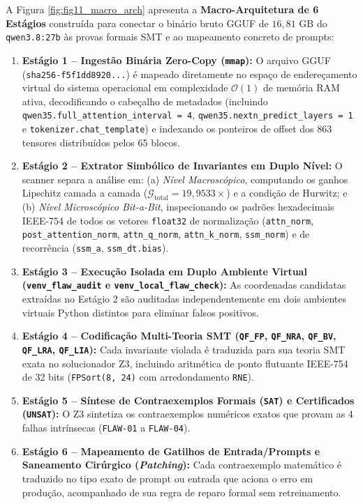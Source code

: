 \documentclass[11pt,a4paper]{article}
\theoremstyle{definition}
\begin{document}
A Figura \ref{fig:fig11_macro_arch} apresenta a \textbf{Macro-Arquitetura de 6 Estágios} construída para conectar o binário bruto GGUF de $16{,}81\text{ GB}$ do \texttt{qwen3.8:27b} às provas formais SMT e ao mapeamento concreto de prompts:
\begin{enumerate}
    \item \textbf{Estágio 1 -- Ingestão Binária Zero-Copy (\texttt{mmap}):} O arquivo GGUF (\texttt{sha256-f5f1dd8920...}) é mapeado diretamente no espaço de endereçamento virtual do sistema operacional em complexidade $\mathcal{O}(1)$ de memória RAM ativa, decodificando o cabeçalho de metadados (incluindo \texttt{qwen35.full\_attention\_interval = 4}, \texttt{qwen35.nextn\_predict\_layers = 1} e \texttt{tokenizer.chat\_template}) e indexando os ponteiros de offset dos 863 tensores distribuídos pelos 65 blocos.
    \item \textbf{Estágio 2 -- Extrator Simbólico de Invariantes em Duplo Nível:} O scanner separa a análise em: (a) \textit{Nível Macroscópico}, computando os ganhos Lipschitz camada a camada ($\mathcal{G}_{\text{total}} = 19{,}9533\times$) e a condição de Hurwitz; e (b) \textit{Nível Microscópico Bit-a-Bit}, inspecionando os padrões hexadecimais IEEE-754 de todos os vetores \texttt{float32} de normalização (\texttt{attn\_norm}, \texttt{post\_attention\_norm}, \texttt{attn\_q\_norm}, \texttt{attn\_k\_norm}, \texttt{ssm\_norm}) e de recorrência (\texttt{ssm\_a}, \texttt{ssm\_dt.bias}).
    \item \textbf{Estágio 3 -- Execução Isolada em Duplo Ambiente Virtual (\texttt{venv\_flaw\_audit} e \texttt{venv\_local\_flaw\_check}):} As coordenadas candidatas extraídas no Estágio 2 são auditadas independentemente em dois ambientes virtuais Python distintos para eliminar falsos positivos.
    \item \textbf{Estágio 4 -- Codificação Multi-Teoria SMT (\texttt{QF\_FP}, \texttt{QF\_NRA}, \texttt{QF\_BV}, \texttt{QF\_LRA}, \texttt{QF\_LIA}):} Cada invariante violada é traduzida para sua teoria SMT exata no solucionador Z3, incluindo aritmética de ponto flutuante IEEE-754 de 32 bits (\texttt{FPSort(8, 24)} com arredondamento \texttt{RNE}).
    \item \textbf{Estágio 5 -- Síntese de Contraexemplos Formais (\texttt{SAT}) e Certificados (\texttt{UNSAT}):} O Z3 sintetiza os contraexemplos numéricos exatos que provam as 4 falhas intrínsecas (\texttt{FLAW-01} a \texttt{FLAW-04}).
    \item \textbf{Estágio 6 -- Mapeamento de Gatilhos de Entrada/Prompts e Saneamento Cirúrgico (\textit{Patching}):} Cada contraexemplo matemático é traduzido no tipo exato de prompt ou entrada que aciona o erro em produção, acompanhado de sua regra de reparo formal sem retreinamento.
\end{enumerate}
\end{document}
